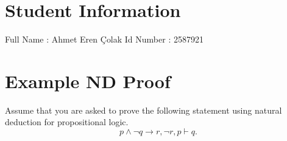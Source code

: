 \documentclass[11pt]{article}
\begin{document}
\section*{Student Information } 
Full Name :  Ahmet Eren {\c C}olak \newline
Id Number :  2587921 


\section*{Example ND Proof}

Assume that you are asked to prove the following statement using natural deduction for propositional logic.
\\
\begin{equation*}
p \wedge \neg q \rightarrow r, \neg r, p \vdash q.
\end{equation*}


\begin{center}
	\begin{fitchproof}
	\end{fitchproof}
\end{center}
\noindent
\newline
\end{document}
